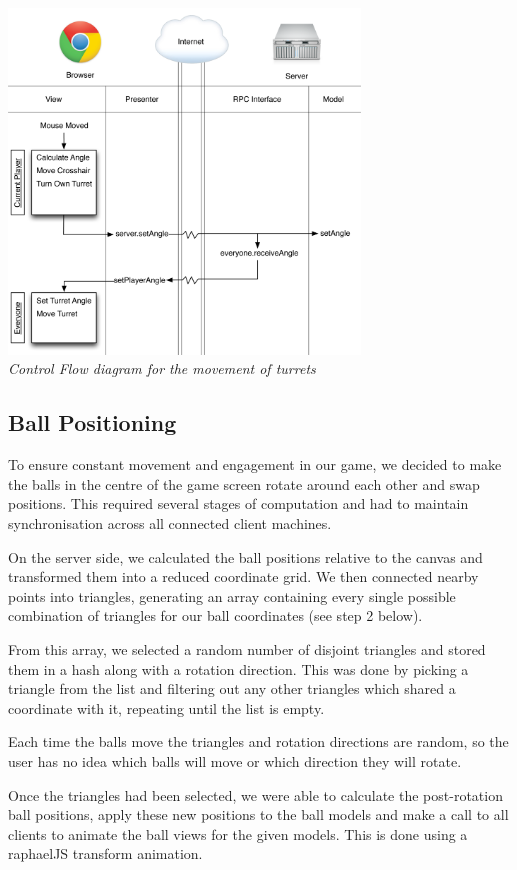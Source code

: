 \documentclass[a4wide, 11pt]{article}
\begin{document}
\begin{center}

    \includegraphics[width=0.7\textwidth]{images/mousemove_diag.png} \\
  \emph{Control Flow diagram for the movement of turrets}
\end{center}

\subsection{Ball Positioning}
To ensure constant movement and engagement in our game, we decided to make the balls in the centre of the game screen rotate around each other and swap positions. This required several stages of computation and had to maintain synchronisation across all connected client machines.

On the server side, we calculated the ball positions relative to the canvas and transformed them into a reduced coordinate grid. We then connected nearby points into triangles, generating an array containing every single possible combination of triangles for our ball coordinates (see step 2 below).

From this array, we selected a random number of disjoint triangles and stored them in a hash along with a rotation direction. This was done by picking a triangle from the list and filtering out any other triangles which shared a coordinate with it, repeating until the list is empty.

Each time the balls move the triangles and rotation directions are random, so the user has no idea which balls will move or which direction they will rotate.

Once the triangles had been selected, we were able to calculate the post-rotation ball positions, apply these new positions to the ball models and make a call to all clients to animate the ball views for the given models. This is done using a raphaelJS transform animation.
\end{document}
